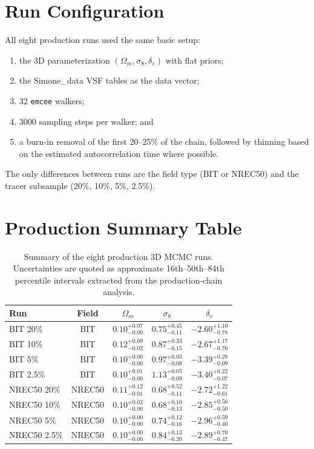 \documentclass[12pt]{report}
\begin{document}
\section{Run Configuration}

All eight production runs used the same basic setup:
\begin{enumerate}
    \item the 3D parameterization $(\Omega_m,\sigma_8,\delta_v)$ with flat priors;
    \item the Simone\_data VSF tables as the data vector;
    \item 32 \texttt{emcee} walkers;
    \item 3000 sampling steps per walker; and
    \item a burn-in removal of the first 20--25\% of the chain, followed by thinning based on the estimated autocorrelation time where possible.
\end{enumerate}

The only differences between runs are the field type (BIT or NREC50) and the tracer subsample (20\%, 10\%, 5\%, 2.5\%).

\section{Production Summary Table}

\begin{table}[H]
    \centering
    \caption{Summary of the eight production 3D MCMC runs. Uncertainties are quoted as approximate 16th--50th--84th percentile intervals extracted from the production-chain analysis.}
    \label{tab:appendix_mcmc_summary}
    \begin{tabular}{lcccc}
        \toprule
        \textbf{Run} & \textbf{Field} & \textbf{$\Omega_m$} & \textbf{$\sigma_8$} & \textbf{$\delta_v$} \\
        \midrule
        BIT 20\%      & BIT     & $0.10^{+0.07}_{-0.00}$ & $0.75^{+0.45}_{-0.11}$ & $-2.60^{+1.10}_{-0.78}$ \\
        BIT 10\%      & BIT     & $0.12^{+0.09}_{-0.02}$ & $0.87^{+0.33}_{-0.15}$ & $-2.67^{+1.17}_{-0.76}$ \\
        BIT 5\%       & BIT     & $0.10^{+0.00}_{-0.00}$ & $0.97^{+0.03}_{-0.08}$ & $-3.39^{+0.28}_{-0.09}$ \\
        BIT 2.5\%     & BIT     & $0.10^{+0.01}_{-0.00}$ & $1.13^{+0.05}_{-0.09}$ & $-3.40^{+0.22}_{-0.07}$ \\
        NREC50 20\%   & NREC50  & $0.11^{+0.12}_{-0.01}$ & $0.68^{+0.52}_{-0.11}$ & $-2.72^{+1.22}_{-0.61}$ \\
        NREC50 10\%   & NREC50  & $0.10^{+0.02}_{-0.00}$ & $0.68^{+0.10}_{-0.13}$ & $-2.85^{+0.56}_{-0.50}$ \\
        NREC50 5\%    & NREC50  & $0.10^{+0.00}_{-0.00}$ & $0.74^{+0.12}_{-0.16}$ & $-2.96^{+0.59}_{-0.40}$ \\
        NREC50 2.5\%  & NREC50  & $0.10^{+0.00}_{-0.00}$ & $0.84^{+0.13}_{-0.20}$ & $-2.89^{+0.70}_{-0.47}$ \\
        \bottomrule
    \end{tabular}
\end{table}
\end{document}
